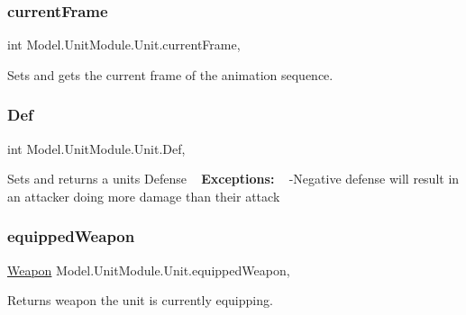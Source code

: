 \subsubsection{\texorpdfstring{current\+Frame}{currentFrame}}
{\footnotesize\ttfamily int Model.\+Unit\+Module.\+Unit.\+current\+Frame\hspace{0.3cm}{\ttfamily [get]}, {\ttfamily [set]}}

Sets and gets the current frame of the animation sequence. \hypertarget{interface_model_1_1_unit_module_1_1_unit_ab7f2b040f7c5d88f1d2885be81f42b11}{}\label{interface_model_1_1_unit_module_1_1_unit_ab7f2b040f7c5d88f1d2885be81f42b11} 
\subsubsection{\texorpdfstring{Def}{Def}}
{\footnotesize\ttfamily int Model.\+Unit\+Module.\+Unit.\+Def\hspace{0.3cm}{\ttfamily [get]}, {\ttfamily [set]}}

Sets and returns a unit\textquotesingle{}s Defense ~\newline
 {\bfseries Exceptions\+:} ~\newline
 -\/\+Negative defense will result in an attacker doing more damage than their attack \hypertarget{interface_model_1_1_unit_module_1_1_unit_adc2957db8ce505040b48200ae1db9c4b}{}\label{interface_model_1_1_unit_module_1_1_unit_adc2957db8ce505040b48200ae1db9c4b} 
\subsubsection{\texorpdfstring{equipped\+Weapon}{equippedWeapon}}
{\footnotesize\ttfamily \hyperlink{interface_model_1_1_weapon_module_1_1_weapon}{Weapon} Model.\+Unit\+Module.\+Unit.\+equipped\+Weapon\hspace{0.3cm}{\ttfamily [get]}, {\ttfamily [set]}}

Returns weapon the unit is currently equipping. \hypertarget{interface_model_1_1_unit_module_1_1_unit_a7faf3a9c000fc65d380d2f07d888e2b1}{}\label{interface_model_1_1_unit_module_1_1_unit_a7faf3a9c000fc65d380d2f07d888e2b1} 
